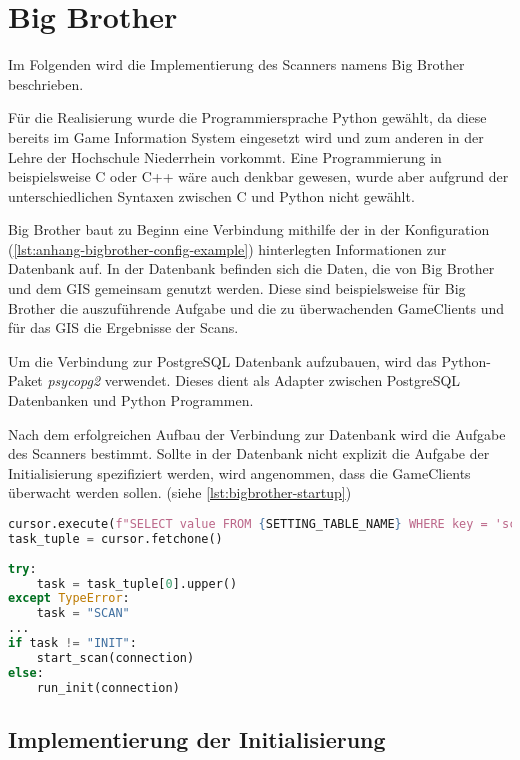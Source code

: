 \section{Big Brother}

Im Folgenden wird die Implementierung des Scanners namens Big Brother beschrieben.

Für die Realisierung wurde die Programmiersprache Python gewählt, da diese bereits im \linebreak Game Information System eingesetzt wird und zum anderen in der Lehre der Hochschule Niederrhein vorkommt. Eine Programmierung in beispielsweise C oder C++ wäre auch denkbar gewesen, wurde aber aufgrund der unterschiedlichen Syntaxen zwischen C und Python nicht gewählt.

Big Brother baut zu Beginn eine Verbindung mithilfe der in der Konfiguration (\autoref{lst:anhang-bigbrother-config-example}) hinterlegten Informationen zur Datenbank auf. In der Datenbank befinden sich die Daten, die von Big Brother und dem GIS gemeinsam genutzt werden. Diese sind beispielsweise für Big Brother die auszuführende Aufgabe und die zu überwachenden GameClients und für das GIS die Ergebnisse der Scans.

Um die Verbindung zur PostgreSQL Datenbank aufzubauen, wird das Python-Paket \textit{psycopg2} verwendet. Dieses dient als Adapter zwischen PostgreSQL Datenbanken und Python Programmen. 

Nach dem erfolgreichen Aufbau der Verbindung zur Datenbank wird die Aufgabe des Scanners bestimmt. Sollte in der Datenbank nicht explizit die Aufgabe der Initialisierung spezifiziert werden, wird angenommen, dass die GameClients überwacht werden sollen. (siehe \autoref{lst:bigbrother-startup})

\begin{lstlisting}[language=Python, frame=single, caption={Aufgabe des Scanners}, captionpos=b, label={lst:bigbrother-startup}]
cursor.execute(f"SELECT value FROM {SETTING_TABLE_NAME} WHERE key = 'scanner.task'")
task_tuple = cursor.fetchone()
	
try:
	task = task_tuple[0].upper()
except TypeError:
	task = "SCAN"
...
if task != "INIT":
	start_scan(connection)
else:
	run_init(connection)	
\end{lstlisting}


\subsection{Implementierung der Initialisierung}

